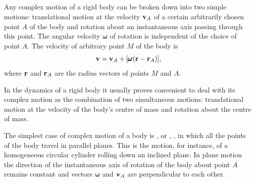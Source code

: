 \subsection{}\label{1.5.9} Any complex motion of a rigid body can be broken down into two simple motions: translational motion at the velocity $\vb{v}_{A}$ of a certain arbitrarily chosen point $A$ of the body and rota­tion about an instantaneous axis passing through this point. The angular velocity $\pmb{\omega}$ of rotation is independent of the choice of point $A$. The velocity of arbitrary point $M$ of the body is
\begin{equation*}%
\vb{v}= \vb{v}_{A}+ [ \pmb{\omega}(\vb{r} - \vb{r}_{A})],
\end{equation*}
where $\vb{r}$ and $\vb{r}_{A}$ are the radius vectors of points $M$ and $A$. 

In the dynamics of a rigid body it usually proves convenient to deal with its complex motion as the combination of two simul­taneous motions: translational motion at the velocity of the body's centre of mass  and rotation about the centre of mass.

The simplest case of complex motion of a body is , or , , in which all the points of the body trav­el in parallel planes. This is the motion, for instance, of a homogeneous circular cylinder rolling down an inclined plane. In plane motion the direction of the instantaneous axis of ro­tation of the body about point $A$ remains constant and vectors $\pmb{\omega}$ and $\vb{v}_{A}$ are perpendicular to each other.























